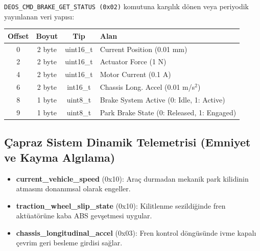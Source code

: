 \documentclass[a4paper,10pt]{article}
\newcommand{\code}[1]{\texttt{#1}}
\begin{document}
\code{DEOS\_CMD\_BRAKE\_GET\_STATUS (0x02)} komutuna karşılık dönen veya periyodik yayınlanan veri yapısı:

\begin{center}
\begin{tabular}{c c c l}
\toprule
\textbf{Offset} & \textbf{Boyut} & \textbf{Tip} & \textbf{Alan} \\
\midrule
0 & 2 byte & uint16\_t & Current Position (0.01 mm) \\
2 & 2 byte & uint16\_t & Actuator Force (1 N) \\
4 & 2 byte & uint16\_t & Motor Current (0.1 A) \\
6 & 2 byte & int16\_t  & Chassis Long. Accel (0.01 m/s$^2$) \\
8 & 1 byte & uint8\_t  & Brake System Active (0: Idle, 1: Active) \\
9 & 1 byte & uint8\_t  & Park Brake State (0: Released, 1: Engaged) \\
\bottomrule
\end{tabular}
\end{center}

\subsection{Çapraz Sistem Dinamik Telemetrisi (Emniyet ve Kayma Algılama)}
\begin{itemize}
    \item \textbf{current\_vehicle\_speed} (0x10): Araç durmadan mekanik park kilidinin atmasını donanımsal olarak engeller.
    \item \textbf{traction\_wheel\_slip\_state} (0x10): Kilitlenme sezildiğinde fren aktüatörüne kaba ABS gevşetmesi uygular.
    \item \textbf{chassis\_longitudinal\_accel} (0x03): Fren kontrol döngüsünde ivme kapalı çevrim geri besleme girdisi sağlar.
\end{itemize}
\end{document}
